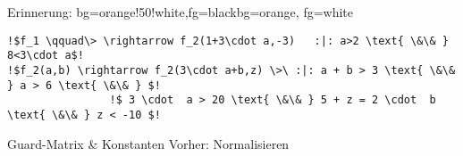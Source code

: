 \begin{frame}[fragile]
	\begin{variableblock}{Erinnerung: \its}{bg=orange!50!white,fg=black}{bg=orange, fg=white}
		\begin{lstlisting}[linewidth=10.5cm, escapechar = !]
!$f_1 \qquad\> \rightarrow f_2(1+3\cdot a,-3)   :|: a>2 \text{ \&\& } 8<3\cdot a$!
!$f_2(a,b) \rightarrow f_2(3\cdot a+b,z) \>\ :|: a + b > 3 \text{ \&\& } a > 6 \text{ \&\& } $!
				!$ 3 \cdot  a > 20 \text{ \&\& } 5 + z = 2 \cdot  b \text{ \&\& } z < -10 $!
		\end{lstlisting}
	\end{variableblock}
	\begin{exampleblock}{Guard-Matrix \& Konstanten}
		Vorher: Normalisieren 
		\begin{center}
		\end{center}
	\end{exampleblock}
\end{frame}

